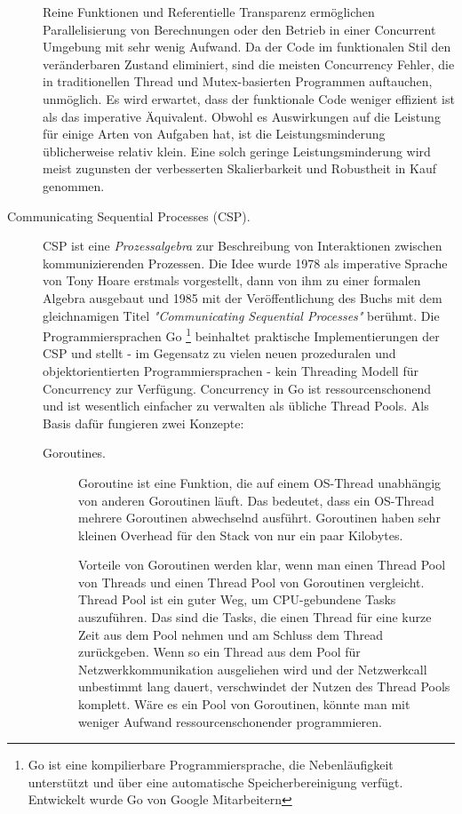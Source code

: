 \begin{description}
	Reine Funktionen und Referentielle Transparenz ermöglichen Parallelisierung von Berechnungen oder den Betrieb in einer Concurrent Umgebung mit sehr wenig Aufwand. Da der Code im funktionalen Stil den veränderbaren Zustand eliminiert, sind die meisten Concurrency Fehler, die in traditionellen Thread und Mutex-basierten Programmen auftauchen, unmöglich. Es wird erwartet, dass der funktionale Code weniger effizient ist als das imperative Äquivalent. Obwohl es Auswirkungen auf die Leistung für einige Arten von Aufgaben hat, ist die Leistungsminderung üblicherweise relativ klein. Eine solch geringe Leistungsminderung wird meist zugunsten der verbesserten Skalierbarkeit und Robustheit in Kauf genommen.
	
	\item[Communicating Sequential Processes (CSP).] CSP ist eine \textit{Prozessalgebra} zur Beschreibung von Interaktionen zwischen kommunizierenden Prozessen. Die Idee wurde 1978 als imperative Sprache von Tony Hoare erstmals vorgestellt, dann von ihm zu einer formalen Algebra ausgebaut und 1985 mit der Veröffentlichung des Buchs mit dem gleichnamigen Titel \textit{"Communicating Sequential Processes"} berühmt. Die Programmiersprachen Go \footnote{Go ist eine kompilierbare Programmiersprache, die Nebenläufigkeit unterstützt und über eine automatische Speicherbereinigung verfügt. Entwickelt wurde Go von Google Mitarbeitern} beinhaltet praktische Implementierungen der CSP und stellt - im Gegensatz zu vielen neuen prozeduralen und objektorientierten Programmiersprachen - kein Threading Modell für Concurrency zur Verfügung. Concurrency in Go ist ressourcenschonend und ist wesentlich einfacher zu verwalten als übliche Thread Pools. Als Basis dafür fungieren zwei Konzepte:
	
	\begin{description} 
		\item[Goroutines.] Goroutine ist eine Funktion, die auf einem OS-Thread unabhängig von anderen Goroutinen läuft. Das bedeutet, dass ein OS-Thread mehrere Goroutinen abwechselnd ausführt. Goroutinen haben sehr kleinen Overhead für den Stack von nur ein paar Kilobytes.
		
		Vorteile von Goroutinen werden klar, wenn man einen Thread Pool von Threads und einen Thread Pool von Goroutinen vergleicht. Thread Pool ist ein guter Weg, um CPU-gebundene Tasks auszuführen. Das sind die Tasks, die einen Thread für eine kurze Zeit aus dem Pool nehmen und am Schluss dem Thread zurückgeben. Wenn so ein Thread aus dem Pool für Netzwerkkommunikation ausgeliehen wird und der Netzwerkcall unbestimmt lang dauert, verschwindet der Nutzen des Thread Pools komplett. Wäre es ein Pool von Goroutinen, könnte man mit weniger Aufwand ressourcenschonender programmieren.
		

\end{description}
\end{description}
